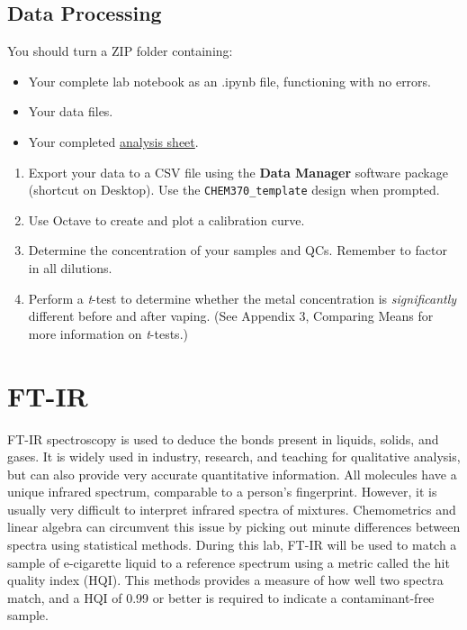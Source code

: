 \documentclass[]{tufte-book}
\providecommand{\tightlist}{%
  \setlength{\itemsep}{0pt}\setlength{\parskip}{0pt}}
\begin{document}
\hypertarget{data-processing-2}{%
\subsection{Data Processing}\label{data-processing-2}}

\begin{marginfigure}
You should turn a ZIP folder containing:

\begin{itemize}
\tightlist
\item
  Your complete lab notebook as an .ipynb file, functioning with no
  errors.\\
\item
  Your data files.\\
\item
  Your completed
  \href{https://github.com/alphonse/alphonse.github.io/raw/master/devel/chem370/assignments/excel-templates/rotation_faas_data-analysis.xlsx}{analysis
  sheet}.
\end{itemize}
\end{marginfigure}

\begin{enumerate}
\def\labelenumi{\arabic{enumi}.}
\tightlist
\item
  Export your data to a CSV file using the \textbf{Data Manager} software package (shortcut on Desktop). Use the \texttt{CHEM370\_template} design when prompted.
\item
  Use Octave to create and plot a calibration curve.
\item
  Determine the concentration of your samples and QCs. Remember to factor in all dilutions.
\item
  Perform a \emph{t}-test to determine whether the metal concentration is \emph{significantly} different before and after vaping. (See Appendix 3, Comparing Means for more information on \emph{t}-tests.)
\end{enumerate}

\newpage

\hypertarget{ft-ir}{%
\section{FT-IR}\label{ft-ir}}

FT-IR spectroscopy is used to deduce the bonds present in liquids, solids, and gases. It is widely used in industry, research, and teaching for qualitative analysis, but can also provide very accurate quantitative information. All molecules have a unique infrared spectrum, comparable to a person's fingerprint. However, it is usually very difficult to interpret infrared spectra of mixtures. Chemometrics and linear algebra can circumvent this issue by picking out minute differences between spectra using statistical methods. During this lab, FT-IR will be used to match a sample of e-cigarette liquid to a reference spectrum using a metric called the hit quality index (HQI). This methods provides a measure of how well two spectra match, and a HQI of 0.99 or better is required to indicate a contaminant-free sample.
\end{document}
